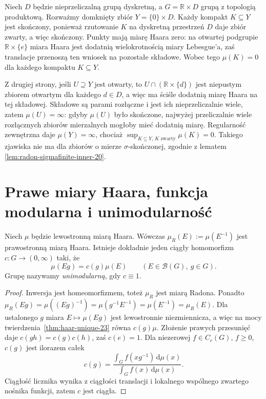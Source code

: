 \begin{przyklad}
\label{ex:haar-non-sigma-compact-23}
Niech $D$ będzie nieprzeliczalną grupą dyskretną,
a $G=\mathbb R\times D$ grupą z topologią produktową.
Rozważmy domknięty zbiór $Y=\{0\}\times D$.
Każdy kompakt $K\subseteq Y$ jest skończony, ponieważ
rzutowanie $K$ na dyskretną przestrzeń $D$ daje zbiór
zwarty, a więc skończony. Punkty mają miarę Haara zero:
na otwartej podgrupie $\mathbb R\times\{e\}$ miara Haara
jest dodatnią wielokrotnością miary Lebesgue'a, zaś
translacje przenoszą ten wniosek na pozostałe składowe.
Wobec tego $\mu(K)=0$ dla każdego kompaktu $K\subseteq Y$.

Z drugiej strony, jeśli $U\supseteq Y$ jest otwarty,
to $U\cap(\mathbb R\times\{d\})$ jest niepustym
zbiorem otwartym dla każdego $d\in D$, a więc ma
ściśle dodatnią miarę Haara na tej składowej.
Składowe są parami rozłączne i jest ich nieprzeliczalnie
wiele, zatem $\mu(U)=\infty$: gdyby $\mu(U)$ było
skończone, najwyżej przeliczalnie wiele rozłącznych
zbiorów mierzalnych mogłoby mieć dodatnią miarę.
Regularność zewnętrzna daje $\mu(Y)=\infty$, chociaż
$\sup_{K\subseteq Y,\,K\text{ zwarty}}\mu(K)=0$.
Takiego zjawiska nie ma dla zbiorów o mierze
$\sigma$-skończonej, zgodnie z lematem
\ref{lem:radon-sigmafinite-inner-20}.
\end{przyklad}

\section{Prawe miary Haara, funkcja modularna i unimodularność}
\begin{twierdzenie}
\label{thm:haar-modular-23}
Niech $\mu$ będzie lewostronną miarą Haara.
Wówczas $\mu_R(E):=\mu(E^{-1})$ jest prawostronną
miarą Haara. Istnieje dokładnie jeden ciągły
homomorfizm $c:G\to(0,\infty)$ taki, że
\begin{equation}\label{eq:haar-modular-23}
 \mu(Eg)=c(g)\mu(E)\qquad(E\in\mathcal B(G),\ g\in G).
\end{equation}
Grupę nazywamy \emph{unimodularną}, gdy $c\equiv1$.
\end{twierdzenie}
\begin{proof}
Inwersja jest homeomorfizmem, toteż $\mu_R$ jest
miarą Radona. Ponadto
$\mu_R(Eg)=\mu((Eg)^{-1})=\mu(g^{-1}E^{-1})
=\mu(E^{-1})=\mu_R(E)$.
Dla ustalonego $g$ miara $E\mapsto\mu(Eg)$ jest
lewostronnie niezmiennicza, a więc na mocy
twierdzenia~\ref{thm:haar-unique-23} równa $c(g)\mu$.
Złożenie prawych przesunięć daje
$c(gh)=c(g)c(h)$, zaś $c(e)=1$.
Dla niezerowej $f\in C_c(G)$, $f\ge0$,
$c(g)$ jest ilorazem całek
\[
 c(g)=\frac{\int_G f(xg^{-1})\,\mathrm d\mu(x)}
 {\int_G f(x)\,\mathrm d\mu(x)}.
\]
Ciągłość licznika wynika z ciągłości translacji
i lokalnego wspólnego zwartego nośnika funkcji,
zatem $c$ jest ciągła.
\end{proof}

